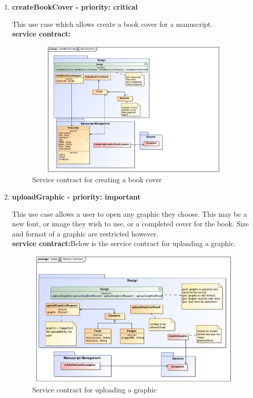 \documentclass[12pt]{article}
\begin{document}
\begin{enumerate}
\item \textbf{createBookCover - priority: critical}
\par{This use case which allows create a book cover for a  manuscript.}\\
\textbf{service contract:}

 \begin{figure}[h]
\includegraphics[height=250px, width=500px]{epsImages/Design/createBookCover.eps}
\caption{Service contract for creating a book cover}
\end{figure}
\item \textbf{uploadGraphic - priority: important}\\
\par{This use case allows a user to open any graphic they choose. This may be a new font, or image they wish to use, or a completed cover for the book. Size and format of a graphic are restricted however.}\\
\textbf{service contract:}Below is the service contract for uploading a graphic.

 \begin{figure}[h]
\includegraphics[height=250px, width=500px]{epsImages/Design/uploadGraphicsServiceContract.eps}
\caption{Service contract for uploading a graphic}
\end{figure}

\end{enumerate}
\end{document}
